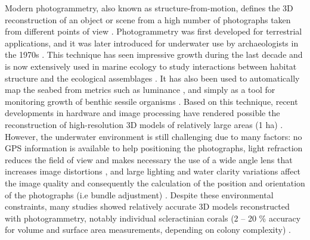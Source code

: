 Modern photogrammetry, also known as structure-from-motion, defines the 3D reconstruction of an object or scene from a high number of photographs taken from different points of view \citep{figueira_accuracy_2015}. Photogrammetry was first developed for terrestrial applications, and it was later introduced for underwater use by archaeologists in the 1970s \citep{drap_underwater_2012, pollio_applications_1968}. This technique has seen impressive growth during the last decade and is now extensively used in marine ecology to study interactions between habitat structure and the ecological assemblages \citep{darling_relationships_2017}. It has also been used to automatically map the seabed from metrics such as luminance \citep{mizuno_simple_2017}, and simply as a tool for monitoring growth of benthic sessile organisms \citep{abdo_efficiently_2006, bythell_three-dimensional_2001, chong_underwater_2002, gutierrez-heredia_simple_2015, holmes_estimating_2008, reichert_3d_2016}. Based on this technique, recent developments in hardware and image processing have rendered possible the reconstruction of high-resolution 3D models of relatively large areas (1 ha) \citep{friedman_multi-scale_2012, gonzalez-rivero_catlin_2014, leon_measuring_2015}. However, the underwater environment is still challenging due to many factors: no GPS information is available to help positioning the photographs, light refraction reduces the field of view and makes necessary the use of a wide angle lens that increases image distortions \citep{guo_accuracy_2016, menna_optical_2017}, and large lighting and water clarity variations affect the image quality and consequently the calculation of the position and orientation of the photographs (i.e bundle adjustment) \citep{bryson_characterization_2017}. Despite these environmental constraints, many studies showed relatively accurate 3D models reconstructed with photogrammetry, notably individual scleractinian corals (2 – 20 \% accuracy for volume and surface area measurements, depending on colony complexity) \citep{bythell_three-dimensional_2001, cocito_3-d_2003, courtney_estimating_2007, gutierrez-heredia_end_2016, lavy_quick_2015}.
